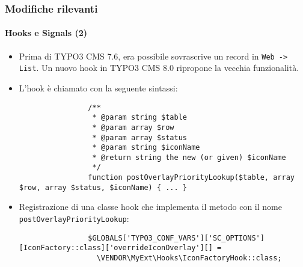 \begin{frame}[fragile]
	\frametitle{Modifiche rilevanti}
	\framesubtitle{Hooks e Signals (2)}

	\lstset{basicstyle=\tiny\ttfamily}

	\begin{itemize}

		\item Prima di TYPO3 CMS 7.6, era possibile sovrascrive un record in \texttt{Web -> List}.
			Un nuovo hook in TYPO3 CMS 8.0 ripropone la vecchia funzionalità.

		\item L'hook è chiamato con la seguente sintassi:
			\begin{lstlisting}
				/**
				 * @param string $table
				 * @param array $row
				 * @param array $status
				 * @param string $iconName
				 * @return string the new (or given) $iconName
				 */
				function postOverlayPriorityLookup($table, array $row, array $status, $iconName) { ... }
			\end{lstlisting}

		\item Registrazione di una classe hook che implementa il metodo con il nome \texttt{postOverlayPriorityLookup}:

			\begin{lstlisting}
				$GLOBALS['TYPO3_CONF_VARS']['SC_OPTIONS'][IconFactory::class]['overrideIconOverlay'][] =
				  \VENDOR\MyExt\Hooks\IconFactoryHook::class;
			\end{lstlisting}

	\end{itemize}

\end{frame}

